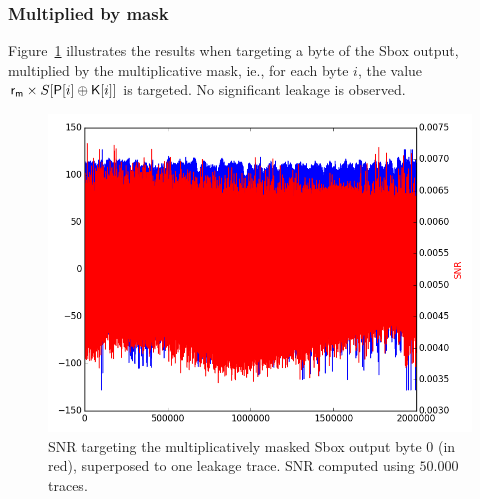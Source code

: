 \subsubsection{Multiplied by mask} 
Figure~\ref{fig:SNR_aS0} illustrates the results when targeting a byte of the Sbox output, multiplied by the multiplicative mask, ie., for each byte $i$, the value $\mathsf{r_m} \times S[\mathsf{P}[i]\oplus \mathsf{K}[i]]$ is targeted. No significant leakage is observed.
\begin{figure}[H]
	\centering 
	\includegraphics[scale=0.35]{figures/2Mpts/SNR_raw_aS0_50ktraces.png}
	\caption{SNR targeting the multiplicatively masked Sbox output byte 0 (in red), superposed to one leakage trace. SNR computed using $50.000$ traces.}
	\label{fig:SNR_aS0}
\end{figure}

